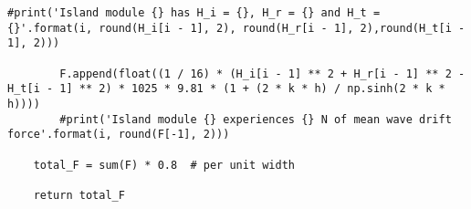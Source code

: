 \begin{mdframed}[backgroundcolor=light-gray, roundcorner=10pt,leftmargin=1, rightmargin=1, innerleftmargin=0, innertopmargin=7,innerbottommargin=0, outerlinewidth=1, linecolor=light-gray]
\begin{lstlisting}[linewidth=\columnwidth,caption=Functions used in post-processing ., label=script: post processing functions]
        #print('Island module {} has H_i = {}, H_r = {} and H_t = {}'.format(i, round(H_i[i - 1], 2), round(H_r[i - 1], 2),round(H_t[i - 1], 2)))

        F.append(float((1 / 16) * (H_i[i - 1] ** 2 + H_r[i - 1] ** 2 - H_t[i - 1] ** 2) * 1025 * 9.81 * (1 + (2 * k * h) / np.sinh(2 * k * h))))
        #print('Island module {} experiences {} N of mean wave drift force'.format(i, round(F[-1], 2)))

    total_F = sum(F) * 0.8  # per unit width

    return total_F


\end{lstlisting}
\end{mdframed}









